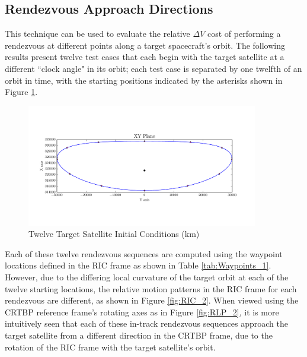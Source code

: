 \documentclass[a4paper]{article}
\begin{document}

\subsection{Rendezvous Approach Directions}

This technique can be used to evaluate the relative \(\Delta V\) cost of performing a rendezvous at different points along a target spacecraft's orbit.  The following results present twelve test cases that each begin with the target satellite at a different ``clock angle" in its orbit; each test case is separated by one twelfth of an orbit in time, with the starting positions indicated by the asterisks shown in Figure \ref{fig:FullOrbit_2}.

\begin{figure}[h] 
	\begin{center}
		\includegraphics[width=0.9\textwidth]{Target_Full_Orbit_2}
		\caption{Twelve Target Satellite Initial Conditions (km)}
		\label{fig:FullOrbit_2}
	\end{center}
\end{figure}

Each of these twelve rendezvous sequences are computed using the waypoint locations defined in the RIC frame as shown in Table \ref{tab:Waypoints_1}.  However, due to the differing local curvature of the target orbit at each of the twelve starting locations, the relative motion patterns in the RIC frame for each rendezvous are different, as shown in Figure \ref{fig:RIC_2}.  When viewed using the CRTBP reference frame's rotating axes as in Figure \ref{fig:RLP_2}, it is more intuitively seen that each of these in-track rendezvous sequences approach the target satellite from a different direction in the CRTBP frame, due to the rotation of the RIC frame with the target satellite's orbit.
\end{document}
